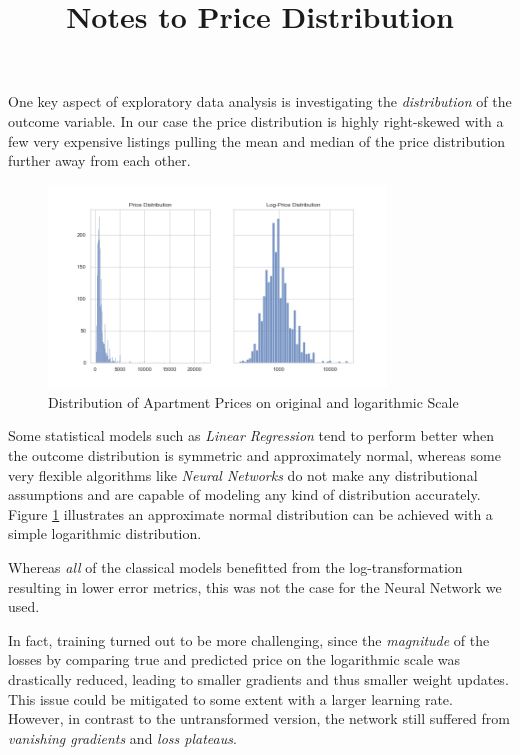 \documentclass[12pt, letterpaper]{article}
\title{Notes to Price Distribution}
\author{}
\date{}
\begin{document}
\maketitle

One key aspect of exploratory data analysis is investigating the \emph{distribution} of the outcome variable.
In our case the price distribution is highly right-skewed with a few very expensive listings pulling the mean and median of the price distribution further away from each other.

\begin{figure}[ht]
    \centering
    \includegraphics[width=0.8\textwidth]{price_distribution.png}
    \caption{Distribution of Apartment Prices on original and logarithmic Scale}
    \label{fig:price-distribution}
\end{figure}

Some statistical models such as \emph{Linear Regression} tend to perform better when the outcome distribution is symmetric and approximately normal, whereas some very flexible algorithms like \emph{Neural Networks} do not make any distributional assumptions and are capable of modeling any kind of distribution accurately.
Figure \ref{fig:price-distribution} illustrates an approximate normal distribution can be achieved with a simple logarithmic distribution.

Whereas \emph{all} of the classical models benefitted from the log-transformation resulting in lower error metrics, this was not the case for the Neural Network we used.

In fact, training turned out to be more challenging, since the \emph{magnitude} of the losses by comparing true and predicted price on the logarithmic scale was drastically reduced, leading to smaller gradients and thus smaller weight updates.
This issue could be mitigated to some extent with a larger learning rate.
However, in contrast to the untransformed version, the network still suffered from \emph{vanishing gradients} and \emph{loss plateaus}.

\newpage



\end{document}
